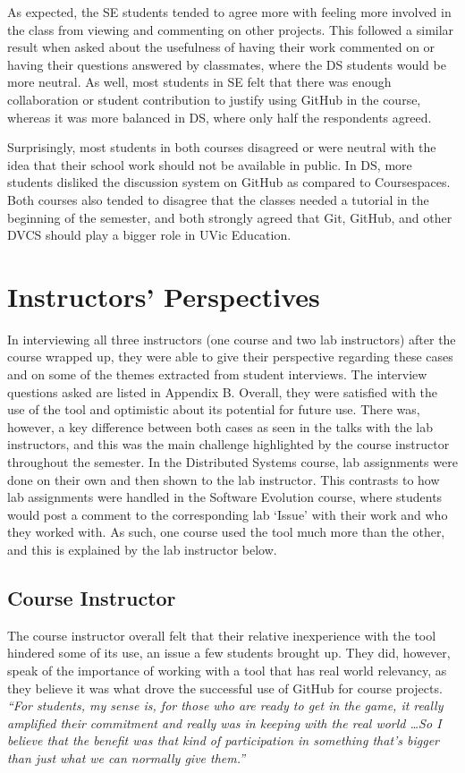 As expected, the SE students tended to agree more with feeling more involved in the class from viewing and commenting on other projects. This followed a similar result when asked about the usefulness of having their work commented on or having their questions answered by classmates, where the DS students would be more neutral. As well, most students in SE felt that there was enough collaboration or student contribution to justify using GitHub in the course, whereas it was more balanced in DS, where only half the respondents agreed.

Surprisingly, most students in both courses disagreed or were neutral with the idea that their school work should not be available in public. In DS, more students disliked the discussion system on GitHub as compared to Coursespaces. Both courses also tended to disagree that the classes needed a tutorial in the beginning of the semester, and both strongly agreed that Git, GitHub, and other DVCS should play a bigger role in UVic Education.

\section{Instructors' Perspectives}
In interviewing all three instructors (one course and two lab instructors) after the course wrapped up, they were able to give their perspective regarding these cases and on some of the themes extracted from student interviews. The interview questions asked are listed in Appendix B. Overall, they were satisfied with the use of the tool and optimistic about its potential for future use. There was, however, a key difference between both cases as seen in the talks with the lab instructors, and this was the main challenge highlighted by the course instructor throughout the semester. In the Distributed Systems course, lab assignments were done on their own and then shown to the lab instructor. This contrasts to how lab assignments were handled in the Software Evolution course, where students would post a comment to the corresponding lab `Issue' with their work and who they worked with. As such, one course used the tool much more than the other, and this is explained by the lab instructor below.

\subsection{Course Instructor}
The course instructor overall felt that their relative inexperience with the tool hindered some of its use, an issue a few students brought up. They did, however, speak of the importance of working with a tool that has real world relevancy, as they believe it was what drove the successful use of GitHub for course projects. \textit{``For students, my sense is, for those who are ready to get in the game, it really amplified their commitment and really was in keeping with the real world \ldots So I believe that the benefit was that kind of participation in something that's bigger than just what we can normally give them.''}

